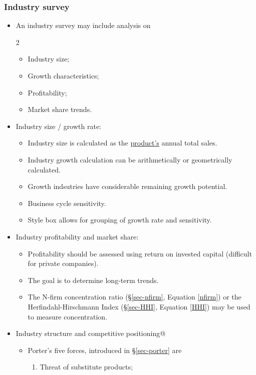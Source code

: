 \documentclass[../notes_compiled.tex]{subfiles}
\begin{document}
\subsubsection{Industry survey}
\begin{itemize}
\item An industry survey may include analysis on
\begin{multicols}{2}
\begin{itemize}
\item Industry size;
\item Growth characteristics;
\item Profitability;
\item Market share trends.
\end{itemize}
\end{multicols}
\item Industry size / growth rate:
\begin{itemize}
\item Industry size is calculated as the \underline{product’s} annual total sales.
\item Industry growth calculation can be arithmetically or geometrically calculated.
\item Growth indsutries have considerable remaining growth potential.
\item Business cycle sensitivity.
\item Style box allows for grouping of growth rate and sensitivity.
\end{itemize}
\item Industry profitability and market share:
\begin{itemize}
\item Profitability should be assessed using return on invested capital (difficult for private companies).
\item The goal is to determine long-term trends.
\item The N-firm concentration ratio (\S\ref{sec-nfirm}, Equation \ref{nfirm}) or the Herfindahl-Hirschmann Index (\S\ref{sec-HHI}, Equation \ref{HHI}) may be used to measure concentration.
\end{itemize}
\item Industry structure and competitive positioning@
\begin{itemize}
\item Porter’s five forces, introduced in \S\ref{sec-porter} are
\begin{enumerate}
\item Threat of substitute products;

\end{enumerate}
\end{itemize}
\end{itemize}
\end{document}
